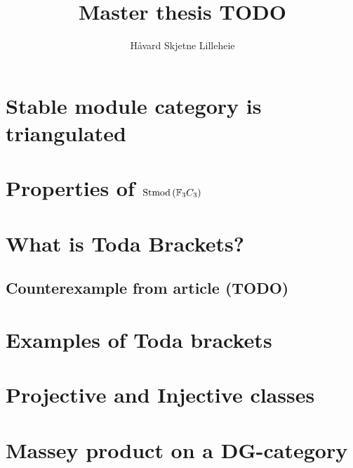 \documentclass[a4paper, 12pt]{article}
\title{Master thesis TODO}
\author{Håvard Skjetne Lilleheie}
\begin{document}
\maketitle

\tableofcontents

\section{Stable module category is triangulated}


\section{Properties of \texorpdfstring{\( \operatorname{Stmod}\left(  {\mathbb{F}}_3 C_3  \right) \)}{Stmod(F\_3C\_3)}} 


\section{What is Toda Brackets?}


\subsection{Counterexample from article (TODO)}


\section{Examples of Toda brackets}


\section{Projective and Injective classes}


\section{Massey product on a DG-category}

\end{document}
